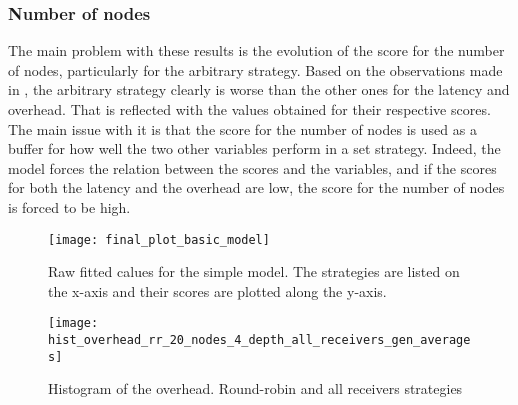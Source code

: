 \subsubsection{Number of nodes}
The main problem with these results is the evolution of the score for the number
of nodes, particularly for the arbitrary strategy. Based on the observations
made in , the arbitrary strategy clearly is worse than the other ones for
the latency and overhead. That is reflected with the values obtained for their
respective scores. The main issue with it is that the score for the number of
nodes is used as a buffer for how well the two other variables perform in a set
strategy. Indeed, the model forces the relation between the scores and the
variables, and if the scores for both the latency and the overhead are low, the
score for the number of nodes is forced to be high.

\begin{figure}[H]
    \centering
    \texttt{[image: final\_plot\_basic\_model]}
    \captionsetup{justification=centering}
    \caption{Raw fitted calues for the simple model. The strategies are listed
    on the x-axis and their scores are plotted along the y-axis. }
    \label{fig:recapTestsPlot}
\end{figure}

%
\begin{figure}[H] 
    \centering
    \texttt{[image: hist\_overhead\_rr\_20\_nodes\_4\_depth\_all\_receivers\_gen\_averages]}
    \captionsetup{justification=centering}
    \caption{Histogram of the overhead. Round-robin and all receivers strategies}
    \label{fig:relOverheadLatencyRR}
\end{figure}



